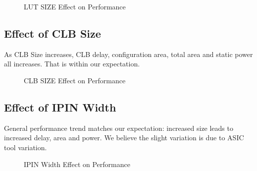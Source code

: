 \begin{figure}[htp]
	\begin{center}
		\renewcommand{\captionfont}{\small}
		\caption{LUT SIZE Effect on Performance}
		\label{fig:perf-lut}
	\end{center}
\end{figure}

\clearpage

\subsection{Effect of CLB Size}
\label{subsec:asic_eff_clb}

As CLB Size increases, CLB delay, configuration area, total area and static power all increases.
That is within our expectation. \par

\begin{figure}[htp]
	\begin{center}
		\renewcommand{\captionfont}{\small}
		\caption{CLB SIZE Effect on Performance}
		\label{fig:perf-clb}
	\end{center}
\end{figure}

\clearpage

\subsection{Effect of IPIN Width}
\label{subsec:asic_eff_ipin_w}

General performance trend matches our expectation: increased size leads to increased delay, area and power.
We believe the slight variation is due to ASIC tool variation. \par

\begin{figure}[htp]
	\begin{center}
		\renewcommand{\captionfont}{\small}
		\caption{IPIN Width Effect on Performance}
		\label{fig:perf-ipinw}
	\end{center}
\end{figure}


